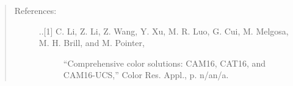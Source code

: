 \documentclass[letterpaper,10pt,english]{sphinxmanual}
\begin{document}
\begin{fulllineitems}
\begin{quote}
\begin{description}
\begin{quote}
\begin{description}
\end{description}\end{quote}

\item[{References:}] \leavevmode\begin{description}
\item[{..{[}1{]} C. Li, Z. Li, Z. Wang, Y. Xu, M. R. Luo, G. Cui, M. Melgosa, M. H. Brill, and M. Pointer, }] \leavevmode
“Comprehensive color solutions: CAM16, CAT16, and CAM16-UCS,” 
Color Res. Appl., p. n/a\textendash{}n/a.

\end{description}

\end{description}
\end{quote}

\end{fulllineitems}

\end{document}
